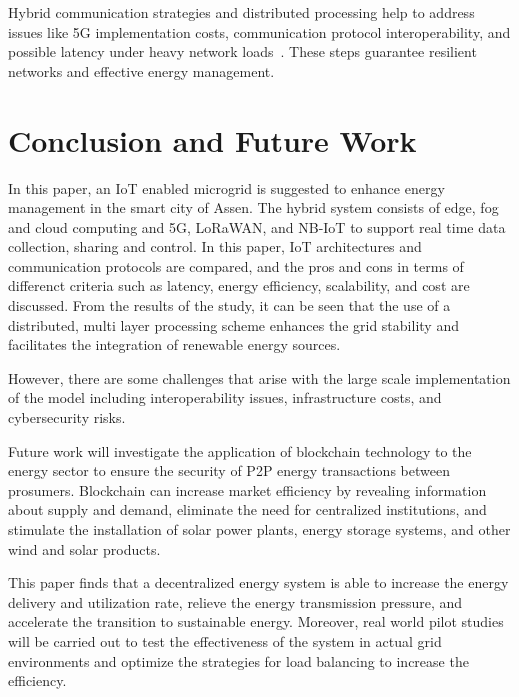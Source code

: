 \documentclass[conference]{IEEEtran}
\begin{document}
Hybrid communication strategies and distributed processing help to address issues like 5G implementation costs, communication protocol interoperability, and possible latency under heavy network loads~\cite{8752482, 10474733, CloudFogMist2021}. These steps guarantee resilient networks and effective energy management.

\section{Conclusion and Future Work}

In this paper, an IoT enabled microgrid is suggested to enhance energy management in the smart city of Assen. The hybrid system consists of edge, fog and cloud computing and 5G, LoRaWAN, and NB-IoT to support real time data collection, sharing and control. In this paper, IoT architectures and communication protocols are compared, and the pros and cons in terms of differenct criteria such as latency, energy efficiency, scalability, and cost are discussed. From the results of the study, it can be seen that the use of a distributed, multi layer processing scheme enhances the grid stability and facilitates the integration of renewable energy sources.

However, there are some challenges that arise with the large scale implementation of the model including interoperability issues, infrastructure costs, and cybersecurity risks.

Future work will investigate the application of blockchain technology to the energy sector to ensure the security of P2P energy transactions between prosumers. Blockchain can increase market efficiency by revealing information about supply and demand, eliminate the need for centralized institutions, and stimulate the installation of solar power plants, energy storage systems, and other wind and solar products.

This paper finds that a decentralized energy system is able to increase the energy delivery and utilization rate, relieve the energy transmission pressure, and accelerate the transition to sustainable energy.
Moreover, real world pilot studies will be carried out to test the effectiveness of the system in actual grid environments and optimize the strategies for load balancing to increase the efficiency.



\end{document}
